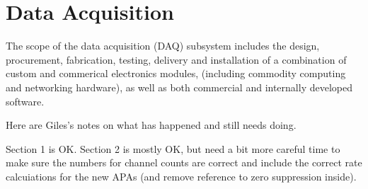 

\newcommand{\LBNE}{[Expt-name]}

\chapter{Data Acquisition}
\label{ch:trig}

The scope of the data acquisition (DAQ) subsystem includes the 
design, procurement, fabrication, testing, delivery and installation 
of a combination of custom and commerical electronics modules, (including 
commodity computing and networking hardware), as well as both commercial 
and internally developed software.   

\begin{editornote}
Here are Giles's notes on what has happened and still needs doing.

Section 1 is OK.  Section 2 is mostly OK, but need a bit more careful
time to make sure the numbers for channel counts are correct and
include the correct rate calcuiations for the new APAs (and remove
reference to zero suppression inside).
\end{editornote}

